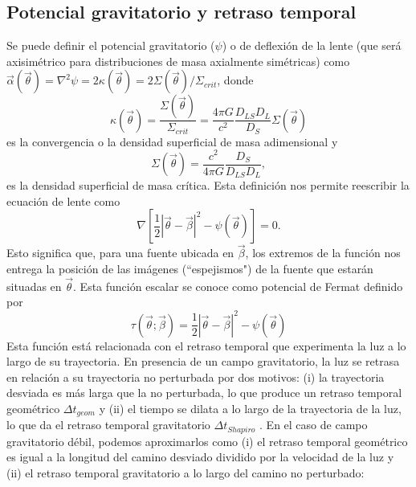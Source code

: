 \documentclass[baaa]{baaa}
\begin{document}
\subsection{Potencial gravitatorio y retraso temporal} \label{S_potencial}

Se puede definir el potencial gravitatorio ($\psi$) o de deflexi\'on de la lente  (que ser\'a axisim\'etrico para distribuciones de masa axialmente sim\'etricas) como 
$\vec{\alpha}(\vec{\theta})=\nabla^2 \psi = 2 \kappa (\vec{\theta})=2 \Sigma(\vec{\theta})/\Sigma_{crit}$, donde 
\begin{equation}
 \kappa(\vec{\theta})=\frac{\Sigma(\vec{\theta})}{\Sigma_{crit}}= \frac{4 \pi G}{c^2} \frac{D_{LS} D_L}{D_S} \Sigma(\vec{\theta})
\end{equation}
es la convergencia o la densidad superficial de masa adimensional y 
\begin{equation}
	\Sigma(\vec{\theta})=\frac{c^2}{4 \pi G} \frac{D_S}{D_{LS} D_L}, 
\end{equation}
es la densidad superficial de masa crítica. Esta definici\'on nos permite reescribir la ecuación de lente como
\begin{equation}
	\nabla \left[ \frac{1}{2} |\vec{\theta} - \vec{\beta}|^2 - \psi (\vec{\theta}) \right]=0. 
\end{equation}
Esto significa que, para una fuente ubicada en $\vec{\beta}$, los extremos de la funci\'on nos entrega la posici\'on de  las im\'agenes (``espejismos") de la fuente que estar\'an  situadas en $\vec{\theta}$. Esta función escalar se conoce como potencial de Fermat definido por
\begin{equation}
	\tau (\vec{\theta};\vec{\beta})= \frac{1}{2} |\vec{\theta} - \vec{\beta}|^2 - \psi (\vec{\theta})
\end{equation}
Esta funci\'on est\'a relacionada con el retraso temporal que experimenta la luz a lo largo de su trayectoria. En presencia de un campo gravitatorio, la luz se retrasa en relaci\'on a su trayectoria no perturbada por dos motivos: (i) la trayectoria desviada es m\'as larga que la no perturbada, lo que produce un retraso temporal geométrico $\Delta t_{geom}$ y (ii) el tiempo se dilata a lo largo de la trayectoria de la luz, lo que da el retraso temporal gravitatorio $\Delta t_{Shapiro}$ \citep[discutido por primera vez por][]{shapiro1964}. 
En el caso de campo gravitatorio d\'ebil, podemos aproximarlos como (i) el retraso temporal geom\'etrico es igual a la longitud del camino desviado dividido por la velocidad de la luz y (ii) el retraso temporal gravitatorio a lo largo del camino no perturbado:
\end{document}

